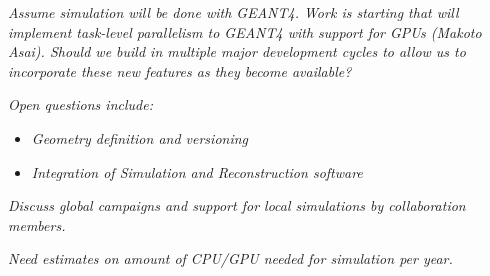 \emph{Assume simulation will be done with GEANT4. Work is starting that will implement task-level parallelism to GEANT4 with support for GPUs (Makoto Asai). Should we build in multiple major development cycles to allow us to incorporate these new features as they become available?}

\emph{Open questions include:}
\begin{itemize}
    \item \emph{Geometry definition and versioning}
    \item \emph{Integration of Simulation and Reconstruction software}
\end{itemize}

\emph{Discuss global campaigns and support for local simulations by collaboration members.}

\emph{Need estimates on amount of CPU/GPU needed for simulation per year. }
